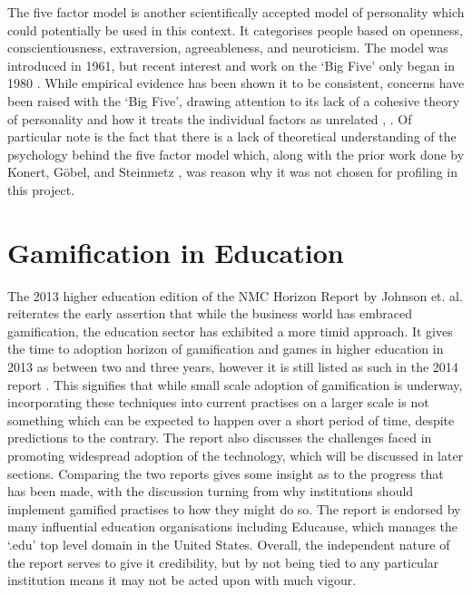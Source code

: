 \documentclass[12pt,a4paper,twoside]{report}
\begin{document}
The five factor model is another scientifically accepted model of personality which could potentially be used in this context. It categorises people based on openness, conscientiousness, extraversion, agreeableness, and neuroticism. The model was introduced in 1961, but recent interest and work on the `Big Five' only began in 1980 \cite{wiki-ffm}. While empirical evidence has been shown it to be consistent, concerns have been raised with the `Big Five', drawing attention to its lack of a cohesive theory of personality and how it treats the individual factors as unrelated \cite{block2010five}, \cite{eysenck1992four}. Of particular note is the fact that there is a lack of theoretical understanding of the psychology behind the five factor model \cite{eysenck1992four} which, along with the prior work done by Konert, G{\"o}bel, and Steinmetz \cite{konertmodeling}, was reason why it was not chosen for profiling in this project.

\section{Gamification in Education}
The 2013 higher education edition of the NMC Horizon Report by Johnson et. al. \cite{johnson2013nmc} reiterates the early assertion that while the business world has embraced gamification, the education sector has exhibited a more timid approach. It gives the time to adoption horizon of gamification and games in higher education in 2013 as between two and three years, however it is still listed as such in the 2014 report \cite{johnson2014nmc}. This signifies that while small scale adoption of gamification is underway, incorporating these techniques into current practises on a larger scale is not something which can be expected to happen over a short period of time, despite predictions to the contrary. The report also discusses the challenges faced in promoting widespread adoption of the technology, which will be discussed in later sections. Comparing the two reports gives some insight as to the progress that has been made, with the discussion turning from why institutions should implement gamified practises to how they might do so. The report is endorsed by many influential education organisations including Educause, which manages the `.edu' top level domain in the United States.  Overall, the independent nature of the report serves to give it credibility, but by not being tied to any particular institution means it may not be acted upon with much vigour.
\end{document}
